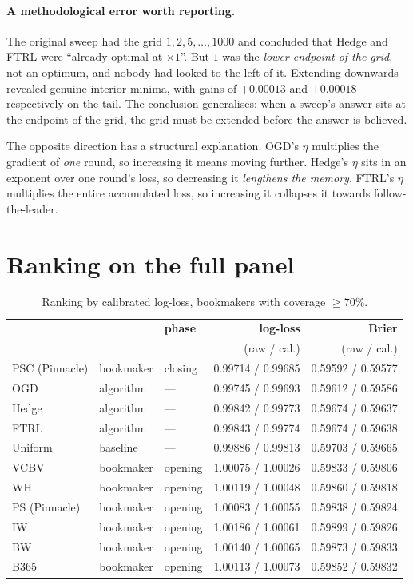 \documentclass[12pt,a4paper,oneside]{report}
\renewcommand{\_}{\oldunderscore\allowbreak}
\theoremstyle{definition}
\theoremstyle{plain}
\theoremstyle{remark}
\begin{document}
\paragraph{A methodological error worth reporting.} The original sweep had the grid
$1, 2, 5, \dots, 1000$ and concluded that Hedge and FTRL were ``already optimal at $\times 1$''.
But $1$ was the \emph{lower endpoint of the grid}, not an optimum, and nobody had looked to the
left of it. Extending downwards revealed genuine interior minima, with gains of $+0.00013$ and
$+0.00018$ respectively on the tail. The conclusion generalises: when a sweep's answer sits at the
endpoint of the grid, the grid must be extended before the answer is believed.

The opposite direction has a structural explanation. OGD's $\eta$ multiplies the gradient of
\emph{one} round, so increasing it means moving further. Hedge's $\eta$ sits in an exponent over
one round's loss, so decreasing it \emph{lengthens the memory}. FTRL's $\eta$ multiplies the
entire accumulated loss, so increasing it collapses it towards follow-the-leader.

\section{Ranking on the full panel}

\begin{table}[H]
\centering
\small
\begin{tabular}{@{}lllrr@{}}
\toprule
& & \textbf{phase} & \textbf{log-loss} & \textbf{Brier} \\
& & & (raw / cal.) & (raw / cal.) \\
\midrule
PSC (Pinnacle) & bookmaker & closing & 0.99714 / 0.99685 & 0.59592 / 0.59577 \\
OGD            & algorithm & ---     & 0.99745 / 0.99693 & 0.59612 / 0.59586 \\
Hedge          & algorithm & ---     & 0.99842 / 0.99773 & 0.59674 / 0.59637 \\
FTRL           & algorithm & ---     & 0.99843 / 0.99774 & 0.59674 / 0.59638 \\
Uniform        & baseline  & ---     & 0.99886 / 0.99813 & 0.59703 / 0.59665 \\
VC\_BV         & bookmaker & opening & 1.00075 / 1.00026 & 0.59833 / 0.59806 \\
WH             & bookmaker & opening & 1.00119 / 1.00048 & 0.59860 / 0.59818 \\
PS (Pinnacle)  & bookmaker & opening & 1.00083 / 1.00055 & 0.59838 / 0.59824 \\
IW             & bookmaker & opening & 1.00186 / 1.00061 & 0.59899 / 0.59826 \\
BW             & bookmaker & opening & 1.00140 / 1.00065 & 0.59873 / 0.59833 \\
B365           & bookmaker & opening & 1.00113 / 1.00073 & 0.59852 / 0.59832 \\
\bottomrule
\end{tabular}
\caption{Ranking by calibrated log-loss, bookmakers with coverage $\geq$70\%.}
\label{tab:ranking}
\end{table}
\end{document}
